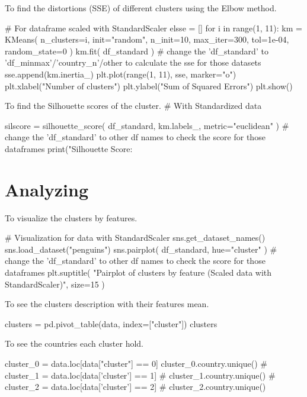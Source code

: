 \documentclass{swfuthesise}
\begin{document}
To find the distortions (SSE) of different clusters using the Elbow method.

\begin{pythoncode}
# For dataframe scaled with StandardScaler
elsse = []
for i in range(1, 11):
    km = KMeans(
        n_clusters=i, init="random", n_init=10, max_iter=300, tol=1e-04, random_state=0
    )
    km.fit(
        df_standard
    )  # change the 'df_standard' to 'df_minmax'/'country_n'/other to calculate the sse for those datasets
    sse.append(km.inertia_)
plt.plot(range(1, 11), sse, marker="o")
plt.xlabel("Number of clusters")
plt.ylabel("Sum of Squared Errors")
plt.show()
\end{pythoncode}

To find the Silhouette scores of the cluster.
\# With Standardized data

\begin{pythoncode}
silscore = silhouette_score(
    df_standard, km.labels_, metric="euclidean"
)  # change the 'df_standard' to other df names to check the score for those dataframes
print("Silhouette Score: %
\end{pythoncode}
% 

\section{Analyzing}

To visualize the clusters by features.

\begin{pythoncode}
# Visualization for data with StandardScaler
sns.get_dataset_names()
sns.load_dataset("penguins")
sns.pairplot(
    df_standard, hue="cluster"
)  # change the 'df_standard' to other df names to check the score for those dataframes
plt.suptitle(
    "Pairplot of clusters by feature (Scaled data with StandardScaler)", size=15
)
\end{pythoncode}

To see the clusters description with their features mean. 

\begin{pythoncode}
clusters = pd.pivot_table(data, index=["cluster"])
clusters
\end{pythoncode}

To see the countries each cluster hold.

\begin{pythoncode}
cluster_0 = data.loc[data["cluster"] == 0]
cluster_0.country.unique()
# cluster_1 = data.loc[data['cluster'] == 1]
# cluster_1.country.unique()
# cluster_2 = data.loc[data['cluster'] == 2]
# cluster_2.country.unique()
\end{pythoncode}
\end{document}

